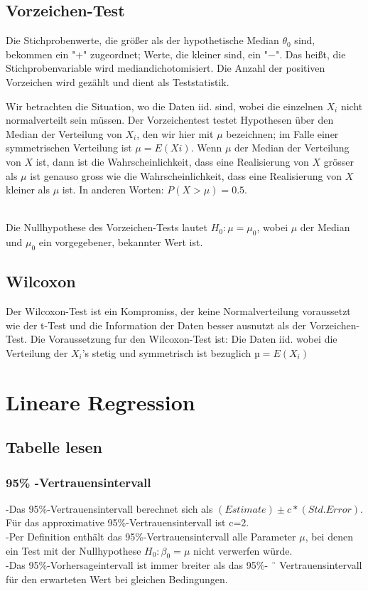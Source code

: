 \documentclass{article}
\begin{document}
\begin{multicols*}{3}
    \subsection{Vorzeichen-Test}
    Die Stichprobenwerte, die größer als der hypothetische Median ${\displaystyle \theta _{0}}$ sind, bekommen ein "$+$" zugeordnet; Werte, die kleiner sind, ein "$-$".
    Das heißt, die Stichprobenvariable wird mediandichotomisiert. Die Anzahl der positiven Vorzeichen wird gezählt und dient als Teststatistik.

    Wir betrachten die Situation, wo die Daten iid. sind, wobei
    die einzelnen $X_i$ nicht normalverteilt sein müssen. Der Vorzeichentest testet Hypothesen über den Median der Verteilung von $X_i$, den wir hier mit $\mu$ bezeichnen;
    im Falle einer symmetrischen Verteilung ist $\mu = E(Xi)$. Wenn $\mu$ der
    Median der Verteilung von $X$ ist, dann ist die Wahrscheinlichkeit, dass eine Realisierung
    von $X$ grösser als $\mu$ ist genauso gross wie die Wahrscheinlichkeit, dass
    eine Realisierung von $X$ kleiner als $\mu$ ist. In anderen Worten: $P(X > \mu) = 0.5$.

    \\Die Nullhypothese des Vorzeichen-Tests lautet $H_0 : \mu = \mu_0$, wobei $\mu$ der Median
    und $\mu_0$ ein vorgegebener, bekannter Wert ist.

    \subsection{Wilcoxon}
    Der Wilcoxon-Test ist ein Kompromiss, der keine Normalverteilung voraussetzt
    wie der t-Test und die Information der Daten besser ausnutzt als der Vorzeichen-Test.
    Die Voraussetzung fur den Wilcoxon-Test ist: Die Daten iid. wobei die Verteilung der $X_i$’s stetig und symmetrisch ist bezuglich $µ =  E(X_i)$

\section{Lineare Regression}
  \subsection{Tabelle lesen}
  \subsubsection{95\% -Vertrauensintervall}
    -Das 95\%-Vertrauensintervall berechnet sich als $(Estimate)\pm c*(Std.Error)$. Für das approximative 95\%-Vertrauensintervall ist c=2.
    \\ -Per Definition enthält das 95\%-Vertrauensintervall alle Parameter $\mu$, bei denen ein Test mit
    der Nullhypothese $H_0 : \beta_0 = \mu$ nicht verwerfen würde.
    \\ -Das 95\%-Vorhersageintervall ist immer breiter als das 95\%- ¨
    Vertrauensintervall für den erwarteten Wert bei gleichen Bedingungen.

\end{multicols*}
\end{document}
